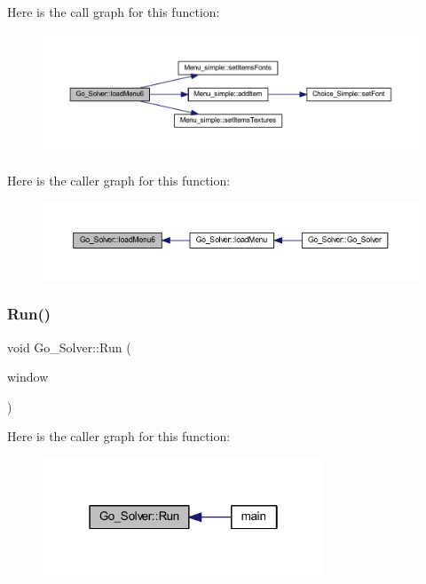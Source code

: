 Here is the call graph for this function\+:
\nopagebreak
\begin{figure}[H]
\begin{center}
\leavevmode
\includegraphics[width=350pt]{class_go___solver_a9aa3c644c34232cbc9bd3341930373c9_cgraph}
\end{center}
\end{figure}
Here is the caller graph for this function\+:
\nopagebreak
\begin{figure}[H]
\begin{center}
\leavevmode
\includegraphics[width=350pt]{class_go___solver_a9aa3c644c34232cbc9bd3341930373c9_icgraph}
\end{center}
\end{figure}
\mbox{\label{class_go___solver_a84c021a62506ef8f5d43aae109298fe0}} 
\subsubsection{\texorpdfstring{Run()}{Run()}}
{\footnotesize\ttfamily void Go\+\_\+\+Solver\+::\+Run (\begin{DoxyParamCaption}\item[{sf\+::\+Render\+Window \&}]{window }\end{DoxyParamCaption})}

Here is the caller graph for this function\+:
\nopagebreak
\begin{figure}[H]
\begin{center}
\leavevmode
\includegraphics[width=238pt]{class_go___solver_a84c021a62506ef8f5d43aae109298fe0_icgraph}
\end{center}
\end{figure}
\mbox{\label{class_go___solver_a8452c66187c526e0a6051bbb42b9bbda}} 
